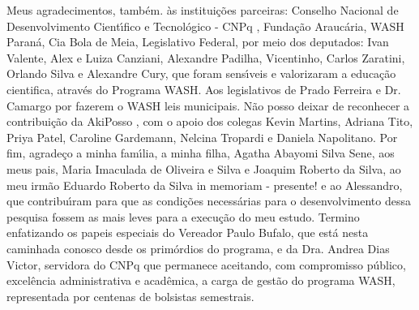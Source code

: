 \begin{agradecimentos}
Meus agradecimentos, tamb\'em. \`as institui\c{c}\~oes parceiras: Conselho Nacional de Desenvolvimento Cient\'{\i}fico e Tecnol\'ogico - CNPq , Funda\c{c}\~ao Arauc\'aria, WASH Paran\'a, Cia Bola de Meia, Legislativo Federal, por meio dos deputados: Ivan Valente, Alex e Luiza Canziani, Alexandre Padilha, Vicentinho, Carlos Zaratini, Orlando Silva e Alexandre Cury, que foram sens\'{\i}veis e valorizaram a educa\c{c}\~ao cientifica, atrav\'es do Programa WASH. Aos legislativos de Prado Ferreira e Dr. Camargo por fazerem o WASH leis municipais. N\~ao posso deixar de reconhecer a contribui\c{c}\~ao da AkiPosso , com o apoio dos colegas Kevin Martins, Adriana Tito, Priya Patel, Caroline Gardemann, Nelcina Tropardi e Daniela Napolitano. Por fim, agrade\c{c}o a minha fam\'{\i}lia, a minha filha, Agatha Abayomi Silva Sene, aos meus pais, Maria Imaculada de Oliveira e Silva e Joaquim Roberto da Silva, ao meu irm\~ao Eduardo Roberto da Silva in memoriam - presente! e ao Alessandro, que contribu\'{\i}ram para que as condi\c{c}\~oes necess\'arias para o desenvolvimento dessa pesquisa fossem as mais leves para a execu\c{c}\~ao do meu estudo.
Termino enfatizando os papeis especiais do Vereador Paulo Bufalo, que est\'a nesta caminhada conosco desde os prim\'ordios do programa, e da Dra. Andrea Dias Victor, servidora do CNPq que permanece aceitando, com compromisso p\'ublico, excel\^encia administrativa e acad\^emica, a carga de gest\~ao do programa WASH, representada por centenas de bolsistas semestrais.

\end{agradecimentos}

